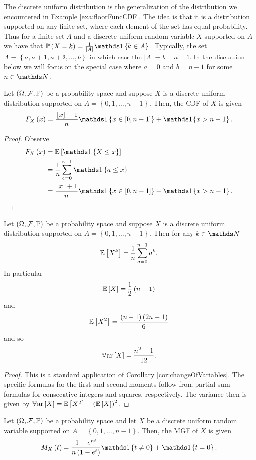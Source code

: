 The discrete uniform distribution is the generalization of the distribution
we encountered in Example \ref{exa:floorFuncCDF}. The idea is that
it is a distribution supported on any finite set, where each element
of the set has equal probability. Thus for a finite set $A$ and a
discrete uniform random variable $X$ supported on $A$ we have that
$\P\left(X=k\right)=\frac{1}{\lvert A\rvert}\indicate\left\{ k\in A\right\} .$
Typically, the set $A=\left\{ a,a+1,a+2,\ldots,b\right\} $ in which
case the $\lvert A\rvert=b-a+1$. In the discussion below we will
focus on the special case where $a=0$ and $b=n-1$ for some $n\in\N$.
\begin{prop}
\label{prop:discreteUniformCDF}Let $\left(\Omega,\mathcal{F},\mathbb{\mathbb{\mathbb{P}}}\right)$ be a probability
space and suppose $X$ is a discrete uniform distribution supported
on $A=\left\{ 0,1,\ldots,n-1\right\} $. Then, the CDF of $X$ is
given
\[
F_{X}\left(x\right)=\frac{\lfloor x\rfloor+1}{n}\indicate\left\{ x\in\left[0,n-1\right]\right\} +\indicate\left\{ x>n-1\right\} .
\]
\end{prop}

\begin{proof}
Observe
\begin{align*}
F_{X}\left(x\right) & =\E\left[\indicate\left\{ X\leq x\right\} \right]\\
 & =\frac{1}{n}\sum_{a=0}^{n-1}\indicate\left\{ a\leq x\right\} \\
 & =\frac{\lfloor x\rfloor+1}{n}\indicate\left\{ x\in\left[0,n-1\right]\right\} +\indicate\left\{ x>n-1\right\} .
\end{align*}
\end{proof}
\begin{prop}
\label{prop:momentsDiscreteUniform}Let $\left(\Omega,\mathcal{F},\mathbb{\mathbb{\mathbb{P}}}\right)$ be a
probability space and suppose $X$ is a discrete uniform distribution
supported on $A=\left\{ 0,1,\ldots,n-1\right\} $. Then for any $k\in\N$
\[
\mathbb{E}\left[X^{k}\right]=\frac{1}{n}\sum_{a=0}^{n-1}a^{k}.
\]
In particular 
\[
\mathbb{E}\left[X\right]=\frac{1}{2}\left(n-1\right)
\]
and 
\[
\mathbb{E}\left[X^{2}\right]=\frac{\left(n-1\right)\left(2n-1\right)}{6}
\]
and so
\[
\mathbb{V\mathrm{ar}}\left[X\right]=\frac{n^{2}-1}{12}.
\]
\end{prop}

\begin{proof}
This is a standard application of Corollary \ref{cor:changeOfVariables}.
The specific formulas for the first and second moments follow from
partial sum formulas for consecutive integers and squares, respectively.
The variance then is given by $\mathbb{V\mathrm{ar}}\left[X\right]=\mathbb{E}\left[X^{2}\right]-\left(\mathbb{E}\left[X\right]\right)^{2}$.
\end{proof}
\begin{prop}
\label{prop:mgfDiscreteUniform}Let $\left(\Omega,\mathcal{F},\mathbb{\mathbb{\mathbb{P}}}\right)$ be a probability
space and let $X$ be a discrete uniform random variable supported
on $A=\left\{ 0,1,\ldots,n-1\right\} $. Then, the MGF of $X$ is
given
\[
M_{X}\left(t\right)=\frac{1-e^{nt}}{n\left(1-e^{t}\right)}\indicate\left\{ t\neq0\right\} +\indicate\left\{ t=0\right\} .
\]
\end{prop}

